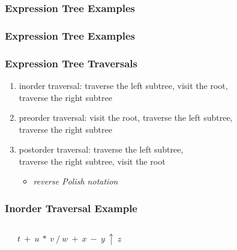 \documentclass[dvipsnames]{beamer}
\begin{document}
\begin{frame}
  \frametitle{Expression Tree Examples}

  \begin{example}[$((7-a)/5)*((a+b) \uparrow 3)$]
    \begin{center}
    \end{center}
  \end{example}
\end{frame}

\begin{frame}
  \frametitle{Expression Tree Examples}

  \begin{example}[$t+(u*v)/(w+x-y \uparrow z)$]
    \begin{center}
    \end{center}
  \end{example}
\end{frame}

\begin{frame}
  \frametitle{Expression Tree Traversals}

  \begin{enumerate}
    \item \alert{inorder traversal}: traverse the left subtree, visit the root,\\
      traverse the right subtree

    \medskip
    \item \alert{preorder traversal}: visit the root, traverse the left subtree,\\
      traverse the right subtree

    \medskip
    \item \alert{postorder traversal}: traverse the left subtree,\\
      traverse the right subtree, visit the root
    \begin{itemize}
      \item \emph{reverse Polish notation}
    \end{itemize}
  \end{enumerate}
\end{frame}

\begin{frame}
  \frametitle{Inorder Traversal Example}

  \begin{example}
    \begin{columns}
      \begin{center}
      \end{center}

      $t ~ + ~ u ~ * ~ v ~ / ~ w ~ + ~ x ~ - ~ y ~ \uparrow ~ z$
    \end{columns}
  \end{example}
\end{frame}
\end{document}
